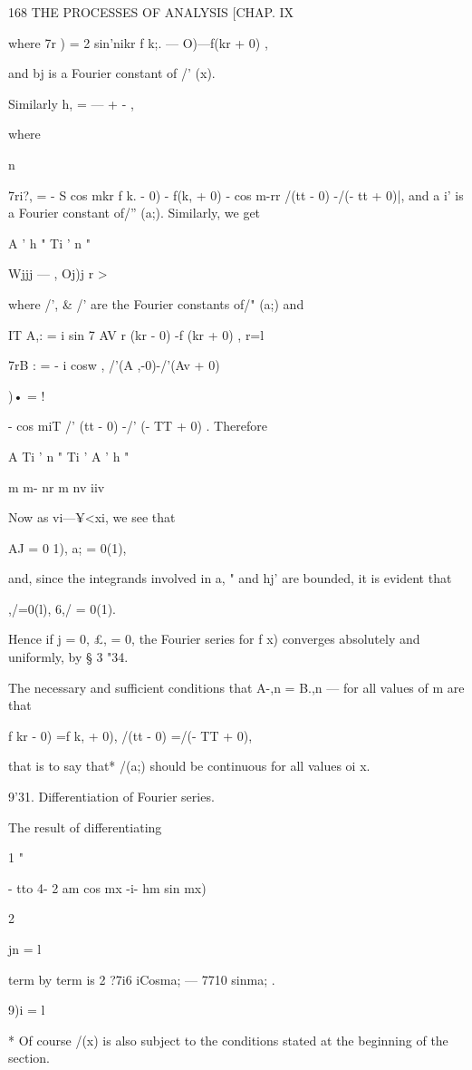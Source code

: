 168 THE PROCESSES OF ANALYSIS [CHAP. IX

where 7r ) = 2 sin'nikr f k;. — O)—f(kr + 0) ,

and bj is a Fourier constant of /' (x).

Similarly h, = — + - ,

where

n

7ri?, = - S cos mkr f k. - 0) - f(k, + 0) - cos m-rr /(tt - 0) -/(- tt
+ 0)|, and a i' is a Fourier constant of/'' (a;). Similarly, we get

A ' h " Ti ' n "

Wjjj — , Oj)j r >

where /', \& /' are the Fourier constants of/" (a;) and

IT A,: = i sin 7 AV r (kr - 0) -f (kr + 0) , r=l

7rB : = - i cosw , /'(A ,-0)-/'(Av + 0)

)• = !

- cos miT /' (tt - 0) -/' (- TT + 0) . Therefore

A Ti ' n " Ti ' A ' h "

m m- nr m nv iiv

Now as vi—¥<xi, we see that

AJ = 0 1), a; = 0(1),

and, since the integrands involved in a, " and hj' are bounded, it is
evident that

 ,/=0(l), 6,/ = 0(1).

Hence if j = 0, £, = 0, the Fourier series for f x) converges
absolutely and uniformly, by § 3 "34.

The necessary and sufficient conditions that A-,n = B.,n — for all
values of m are that

f kr - 0) =f k, + 0), /(tt - 0) =/(- TT + 0),

that is to say that* /(a;) should be continuous for all values oi x.

9'31. Differentiation of Fourier series.

The result of differentiating

1 "

- tto 4- 2 am cos mx -i- hm sin mx)

2

jn = l

term by term is 2 ?7i6 iCosma; — 7710 sinma; .

9)i = l

* Of course /(x) is also subject to the conditions stated at the
beginning of the section.

